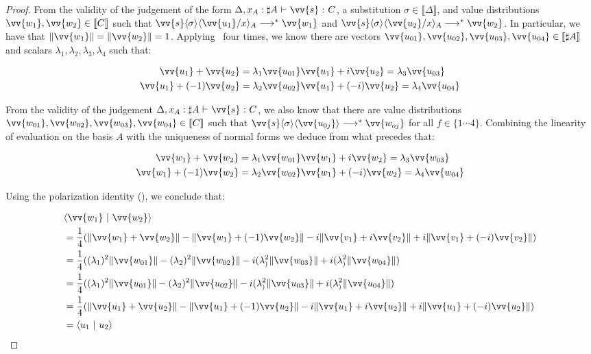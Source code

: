 \documentclass[runningheads,orivec,envcountsame,envcountsect]{llncs}
\newcommand\lra{\longrightarrow}
\newcommand\ansubst[2]{\ensuremath{\langle #1 \rangle_{#2}}}
\def\scal#1#2{\langle{#1}~|~{#2}\rangle}
\def\eval{\lra^*}
\def\sem#1{\llbracket#1\rrbracket}
\def\TYP#1#2#3{#1~{\vdash}~#2~{:}~#3}
\begin{document}
\begin{proof}
    From the validity of the judgement of the form $\TYP{\Delta, x_A:\sharp A}{\vv{s}}{C}$, a substitution $\sigma\in\sem{\Delta}$, and value distributions $\vv{w_1},\vv{w_2}\in\sem{C}$ such that $\vv{s}\ansubst{\sigma}{}\ansubst{\vv{u_1}/x}{A}\eval\vv{w_1}$ and $\vv{s}\ansubst{\sigma}{}\ansubst{\vv{u_2}/x}{A}\eval\vv{w_2}$. In particular, we have that $\|\vv{w_1}\| = \|\vv{w_2}\|=1$. Applying ~four times, we know there are vectors $\vv{u_{01}},\vv{u_{02}},\vv{u_{03}},\vv{u_{04}}\in\sem{\sharp A}$ and scalars $\lambda_1,\lambda_2,\lambda_3,\lambda_4$ such that:
    
    \begin{align*}
        \vv{u_1} + \vv{u_2} = \lambda_1 \vv{u_{01}} & \vv{u_1} + i \vv{u_2} = \lambda_3 \vv{u_{03}} \\
        \vv{u_1} + (-1) \vv{u_2} = \lambda_2 \vv{u_{02}} & \vv{u_1} + (-i) \vv{u_2} = \lambda_4 \vv{u_{04}} \\
    \end{align*}

    From the validity of the judgement  $\TYP{\Delta, x_A:\sharp A}{\vv{s}}{C}$, we also know that there are value distributions $\vv{w_{01}},\vv{w_{02}},\vv{w_{03}},\vv{w_{04}}\in\sem{C}$ such that $\vv{s}\ansubst{\sigma}{}\ansubst{\vv{u_{0j}}}{}\eval\vv{w_{oj}}$ for all $f\in\{1\dotsb 4\}$. Combining the linearity of evaluation on the basis $A$ with the uniqueness of normal forms we deduce from what precedes that:

    \begin{align*}
        \vv{w_1} + \vv{w_2} = \lambda_1 \vv{w_{01}} & \vv{w_1} + i \vv{w_2} = \lambda_3 \vv{w_{03}} \\
        \vv{w_1} + (-1) \vv{w_2} = \lambda_2 \vv{w_{02}} & \vv{w_1} + (-i) \vv{w_2} = \lambda_4 \vv{w_{04}} \\
    \end{align*}

    Using the polarization identity (), we conclude that:

    \begin{align*}
        &\scal{\vv{w_1}}{\vv{w_2}}\\
        &= \frac{1}{4}(\|\vv{w_1}+\vv{w_2}\| - \|\vv{w_1} + (-1)\vv{w_2}\| - i \|\vv{v_1} + i \vv{v_2}\| + i \|\vv{v_1} + (-i) \vv{v_2}\|)\\
        &= \frac{1}{4}((\lambda_1)^2\|\vv{w_{01}}\| - (\lambda_2)^2\|\vv{w_{02}}\| - i (\lambda_)^2 \|\vv{w_{03}}\| + i (\lambda_)^2\|\vv{w_{04}}\|)\\
        &= \frac{1}{4}((\lambda_1)^2\|\vv{u_{01}}\| - (\lambda_2)^2\|\vv{u_{02}}\| - i (\lambda_)^2 \|\vv{u_{03}}\| + i (\lambda_)^2\|\vv{u_{04}}\|)\\
        &= \frac{1}{4}(\|\vv{u_1}+\vv{u_2}\| - \|\vv{u_1} + (-1)\vv{u_2}\| - i \|\vv{u_1} + i \vv{u_2}\| + i \|\vv{u_1} + (-i) \vv{u_2}\|)\\
        &=\scal{u_1}{u_2}
    \end{align*}

\end{proof}
\end{document}
